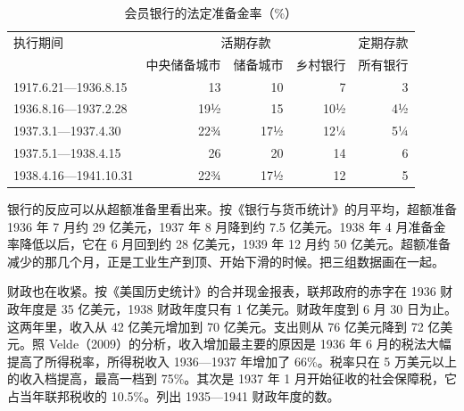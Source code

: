 \begin{table}[tbp]
\centering\small
\caption{会员银行的法定准备金率（\%）}\label{tab:islm-reserves}
\begin{tabularx}{\linewidth}{@{}X r r r r@{}}
\toprule
执行期间 & \multicolumn{3}{c}{活期存款} & 定期存款 \\
 & 中央储备城市 & 储备城市 & 乡村银行 & 所有银行 \\
\midrule
1917.6.21—1936.8.15 & 13 & 10 & 7 & 3 \\
1936.8.16—1937.2.28 & 19½ & 15 & 10½ & 4½ \\
1937.3.1—1937.4.30 & 22¾ & 17½ & 12¼ & 5¼ \\
1937.5.1—1938.4.15 & 26 & 20 & 14 & 6 \\
1938.4.16—1941.10.31 & 22¾ & 17½ & 12 & 5 \\
\bottomrule
\end{tabularx}
\end{table}

银行的反应可以从超额准备里看出来。按《银行与货币统计》的月平均，超额准备 1936 年 7 月约 29 亿美元，1937 年 8 月降到约 7.5 亿美元\cite{bms1943b}。1938 年 4 月准备金率降低以后，它在 6 月回到约 28 亿美元，1939 年 12 月约 50 亿美元\cite{bms1943b}。超额准备减少的那几个月，正是工业生产到顶、开始下滑的时候。把三组数据画在一起。


财政也在收紧。按《美国历史统计》的合并现金报表，联邦政府的赤字在 1936 财政年度是 35 亿美元，1938 财政年度只有 1 亿美元\cite{census1975y}。财政年度到 6 月 30 日为止。这两年里，收入从 42 亿美元增加到 70 亿美元。支出则从 76 亿美元降到 72 亿美元\cite{census1975y}。照 Velde（2009）的分析，收入增加最主要的原因是 1936 年 6 月的税法大幅提高了所得税率，所得税收入 1936—1937 年增加了 66\%\cite{velde2009}。税率只在 5 万美元以上的收入档提高，最高一档到 75\%\cite{velde2009}。其次是 1937 年 1 月开始征收的社会保障税，它占当年联邦税收的 10.5\%\cite{velde2009}。列出 1935—1941 财政年度的数。

